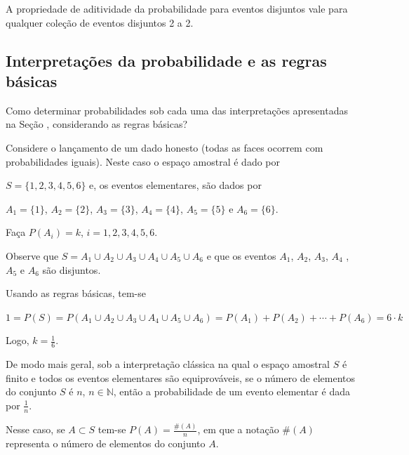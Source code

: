 A propriedade de aditividade da probabilidade para eventos disjuntos vale para qualquer coleção de eventos disjuntos 2 a 2.


\subsection{Interpretações da probabilidade e as regras básicas}
\label{\detokenize{PE511-4:interpretacoes-da-probabilidade-e-as-regras-basicas}}
Como determinar probabilidades sob cada uma das interpretações apresentadas na Seção {\hyperref[\detokenize{PE511-1:sec-interpretacoes}]{}}, considerando as regras básicas?


\begin{example}{ }

Considere o lançamento de um dado honesto (todas as faces ocorrem com probabilidades iguais). Neste caso o espaço amostral é dado por

\(S=\{ 1,2,3,4,5,6\}\) e, os eventos elementares, são dados por

\(A_1=\{1\}\), \(A_2=\{2\}\), \(A_3=\{3\}\), \(A_4=\{4\}\), \(A_5=\{5\}\) e \(A_6=\{6\}\).

Faça \(P(A_i)=k\), \(i=1,2,3,4,5,6\).

Observe que \(S=A_1\cup A_2\cup A_3\cup A_4\cup A_5 \cup A_6\) e que os eventos \(A_1\), \(A_2\), \(A_3\), \(A_4\) , \(A_5\) e \(A_6\) são disjuntos.

Usando as regras básicas, tem-se

\(1=P(S)=P(A_1\cup A_2\cup A_3\cup A_4\cup A_5 \cup A_6)=P(A_1)+P(A_2)+\cdots +P(A_6)=6\cdot k\)

Logo, \(k=\frac{1}{6}\).
\end{example}

De modo mais geral, sob a interpretação clássica na qual o espaço amostral \(S\) é finito e todos os eventos elementares são equiprováveis, se o número de elementos do conjunto \(S\) é \(n\), \(n\in \mathbb{N}\), então a probabilidade de um evento elementar é dada por \(\frac{1}{n}\).

Nesse caso, se \(A\subset S\) tem-se \(P(A)=\frac{\#(A)}{n}\), em que a notação \(\#(A)\) representa o número de elementos do conjunto \(A\).

